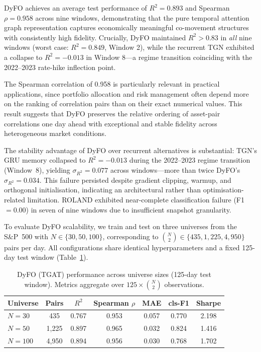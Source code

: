 \documentclass[runningheads]{llncs}
\begin{document}
DyFO achieves an average test performance of $R^2 = 0.893$ and Spearman $\rho = 0.958$ across nine windows, demonstrating that the pure temporal attention graph representation captures economically meaningful co-movement structures with consistently high fidelity. Crucially, DyFO maintained $R^2 > 0.83$ in \emph{all} nine windows (worst case: $R^2 = 0.849$, Window 2), while the recurrent TGN exhibited a collapse to $R^2 = -0.013$ in Window 8---a regime transition coinciding with the 2022--2023 rate-hike inflection point.

The Spearman correlation of 0.958 is particularly relevant in practical applications, since portfolio allocation and risk management often depend more on the ranking of correlation pairs than on their exact numerical values. This result suggests that DyFO preserves the relative ordering of asset-pair correlations one day ahead with exceptional and stable fidelity across heterogeneous market conditions.

The stability advantage of DyFO over recurrent alternatives is substantial: TGN's GRU memory collapsed to $R^2 = -0.013$ during the 2022--2023 regime transition (Window~8), yielding $\sigma_{R^2} = 0.077$ across windows---more than twice DyFO's $\sigma_{R^2} = 0.034$. This failure persisted despite gradient clipping, warmup, and orthogonal initialisation, indicating an architectural rather than optimisation-related limitation. ROLAND exhibited near-complete classification failure (F1 $= 0.00$) in seven of nine windows due to insufficient snapshot granularity.


To evaluate DyFO scalability, we train and test on three universes from the S\&P~500 with $N \in \{30, 50, 100\}$, corresponding to $\binom{N}{2} \in \{435, 1{,}225, 4{,}950\}$ pairs per day. All configurations share identical hyperparameters and a fixed 125-day test window (Table~\ref{tab:scaling}).

\begin{table}[ht]
\caption{DyFO (TGAT) performance across universe sizes (125-day test window). Metrics aggregate over $125 \times \binom{N}{2}$ observations.}
\label{tab:scaling}
\centering
\begin{tabular}{|l|c|c|c|c|c|c|}
\hline
\textbf{Universe} & \textbf{Pairs} & \textbf{$R^2$} &
\textbf{Spearman $\rho$} & \textbf{MAE} & \textbf{cls-F1} &
\textbf{Sharpe} \\
\hline
$N=30$  & 435     & 0.767 & 0.953 & 0.057 & 0.770 & 2.198 \\
$N=50$  & 1{,}225 & 0.897 & 0.965 & 0.032 & 0.824 & 1.416 \\
$N=100$ & 4{,}950 & 0.894 & 0.956 & 0.030 & 0.768 & 1.702 \\
\hline
\end{tabular}
\end{table}
\end{document}
